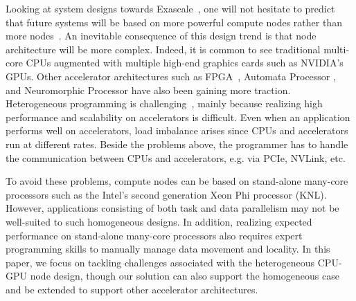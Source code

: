 Looking at system designs towards Exascale~\cite{top500}, one will not hesitate to predict that future systems will be based on more powerful compute nodes rather than more nodes~\cite{Shalf:exascaleChallenges}.  
An inevitable consequence of this design trend is that node architecture will be more complex.
Indeed, it is common to see traditional multi-core CPUs augmented with multiple high-end graphics cards such as NVIDIA's GPUs.
Other accelerator architectures such as FPGA~\cite{Chen:Eyeriss, kim:DeepX, Zhao:2017}, Automata Processor \cite{Fang:UAP}, and Neuromorphic Processor \cite{kim:neuromorphic} have also been gaining more traction.
Heterogeneous programming is challenging~\cite{exascaleRoadMap}, mainly because realizing high performance and scalability on accelerators is difficult.
Even when an application performs well on accelerators, load imbalance arises since CPUs and accelerators run at different rates.
Beside the problems above, the programmer has to handle the communication between CPUs and accelerators, e.g. via PCIe, NVLink, etc.

To avoid these problems, compute nodes can be based on stand-alone many-core processors such as the Intel's second generation Xeon Phi processor (KNL).
However, applications consisting of both task and data parallelism may not be well-suited to such homogeneous designs.
In addition, realizing expected performance on stand-alone many-core processors also requires expert programming skills
to manually manage data movement and locality.
In this paper, we focus on tackling challenges associated with the heterogeneous CPU-GPU node design, though our solution can also support the homogeneous case and be extended to support other accelerator architectures.



